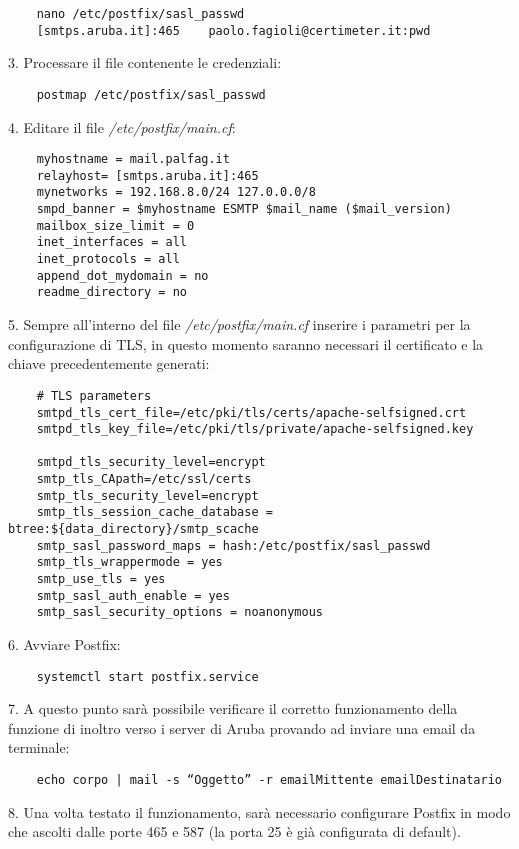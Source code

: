 \begin{verbatim}
    nano /etc/postfix/sasl_passwd
    [smtps.aruba.it]:465    paolo.fagioli@certimeter.it:pwd
\end{verbatim}
3. Processare il file contenente le credenziali:

\begin{verbatim}
    postmap /etc/postfix/sasl_passwd
\end{verbatim}
4. Editare il file \textit{/etc/postfix/main.cf}:

\begin{verbatim}
    myhostname = mail.palfag.it
    relayhost= [smtps.aruba.it]:465
    mynetworks = 192.168.8.0/24 127.0.0.0/8
    smpd_banner = $myhostname ESMTP $mail_name ($mail_version)
    mailbox_size_limit = 0
    inet_interfaces = all
    inet_protocols = all
    append_dot_mydomain = no
    readme_directory = no
\end{verbatim}
5. Sempre all'interno del file \textit{/etc/postfix/main.cf} inserire i parametri per la configurazione di TLS,
in questo momento saranno necessari il certificato e la chiave precedentemente generati:

\begin{verbatim}
    # TLS parameters
    smtpd_tls_cert_file=/etc/pki/tls/certs/apache-selfsigned.crt
    smtpd_tls_key_file=/etc/pki/tls/private/apache-selfsigned.key

    smtpd_tls_security_level=encrypt
    smtp_tls_CApath=/etc/ssl/certs
    smtp_tls_security_level=encrypt
    smtp_tls_session_cache_database = btree:${data_directory}/smtp_scache
    smtp_sasl_password_maps = hash:/etc/postfix/sasl_passwd
    smtp_tls_wrappermode = yes
    smtp_use_tls = yes
    smtp_sasl_auth_enable = yes
    smtp_sasl_security_options = noanonymous
\end{verbatim}
6. Avviare Postfix:
\begin{verbatim}
    systemctl start postfix.service
\end{verbatim}
7. A questo punto sarà possibile verificare il corretto funzionamento della funzione di inoltro verso i server di Aruba 
provando ad inviare una email da terminale:

\begin{verbatim}
    echo corpo | mail -s “Oggetto” -r emailMittente emailDestinatario 
\end{verbatim}
8. Una volta testato il funzionamento, sarà necessario configurare Postfix in modo che ascolti dalle porte 465 e 587 
(la porta 25 è già configurata di default).

